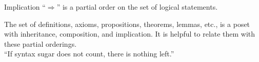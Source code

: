  \begin{exm}
   \label{exm:implication}
   Implication ``$\Rightarrow$''
    is a partial order on the set of logical statements.
 \end{exm}

 \begin{exm}
   The set of definitions, axioms,
    propositions, theorems, lemmas, etc., 
    is a poset with inheritance, composition, and implication.
   It is helpful to relate them with these partial orderings.\\
   ``If syntax sugar does not count, there is nothing left.''
 \end{exm}


